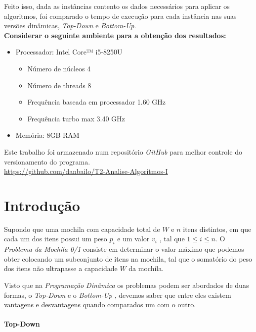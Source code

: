 \documentclass[a4paper, 12pt]{article}
\begin{document}
Feito isso, dada as instâncias contento os dados necessários para aplicar os algoritmos, foi comparado o tempo de execução para cada instância 
nas suas versões dinâmicas, {\it Top-Down} e  {\it Bottom-Up}.\\

{\bf Considerar o seguinte ambiente para a obtenção dos resultados:}
\begin{itemize}
    \item Processador: Intel Core™ i5-8250U
    \begin{itemize}
        \item Número de núcleos 4
        \item Número de threads 8
        \item Frequência baseada em processador 1.60 GHz
        \item Frequência turbo max 3.40 GHz
    \end{itemize}
    \item Memória: 8GB RAM
\end{itemize}
Este trabalho foi armazenado num repositório {\it GitHub} para melhor controle do versionamento do programa.\\
\url{https://github.com/danbailo/T2-Analise-Algoritmos-I}
\clearpage

\section{Introdução}\label{sec:introducao}

Supondo que uma mochila com capacidade total de $W$ e $n$ itens distintos, em que cada um dos itens
possui um peso $p_i$ e um valor $v_i$ , tal que $1 \leq i \leq n$. O {\it Problema da Mochila 0/1} consiste em determinar o 
valor máximo que podemos obter colocando um subconjunto de itens na mochila, tal que o somatório
do peso dos itens não ultrapasse a capacidade $W$ da mochila.

Visto que na {\it Programação Dinâmica} os problemas podem ser abordados de duas formas, o {\it Top-Down} e o {\it Bottom-Up}
, devemos saber que entre eles existem vantagens e desvantagens quando comparados um com o outro.\\~\\
{\bf Top-Down}
\end{document}
